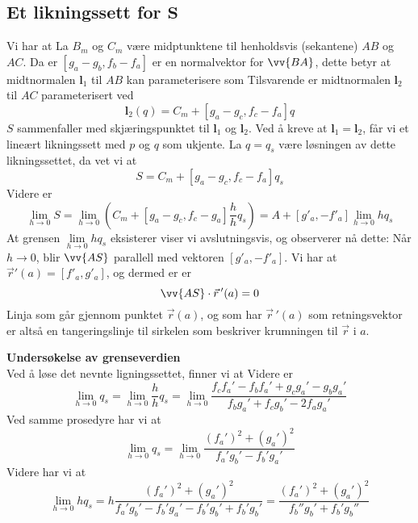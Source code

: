 \subsection*{Et likningssett for $\bm S $}
Vi har at
La $ B_m $ og $ C_m $ være midptunktene til henholdsvis  (sekantene) $ AB $ og $ AC $. Da er
$ [g_a-g_b,f_b-f_a] $ er en normalvektor for $ \vv{BA} $, dette betyr at midtnormalen $\bm l_1 $ til $ AB $ kan parameterisere som
Tilsvarende er midtnormalen $\bm l_2 $ til $ AC $ parameterisert ved
\[ {\bm l_2(q)}=C_m+[g_a-g_c,f_c-f_a] q \]
$ S $ sammenfaller med skjæringspunktet til $\bm l_1 $ og $\bm l_2 $.
Ved å kreve at $\bm l_1= \bm l_2 $, får vi et lineært likningssett med $ p $ og $ q $ som ukjente. La $ q=q_s $ være løsningen av dette likningssettet, da vet vi at
\[ S=C_m+[g_a-g_c, f_c-f_a]q_s\]
Videre er
\[ \lim\limits_{h\to0}S=\lim\limits_{h\to0}\left(C_m+[g_a-g_c, f_c-g_a]\frac{h}{h}q_s\right)=A+[g'_a, -f'_a]\lim\limits_{h\to 0}h q_s \]
At grensen $ \lim\limits_{h\to 0}h q_s $ eksisterer viser vi avslutningsvis, og observerer nå dette: Når $ h\to0 $, blir $ \vv{AS} $ parallell med vektoren $ [g'_a, -f'_a] $. Vi har at $ \vec{r}'(a)=[f'_a, g'_a] $, og dermed er er 
\[ \vv{AS}\cdot \vec{r}\,'(a)=0 \]
Linja som går gjennom punktet $ \vec{r}(a) $, og som har $ \vec{r}\,'(a) $ som retningsvektor er altså en tangeringslinje til sirkelen som beskriver krumningen til $ \vec{r} $ i $ a $. \vsk

\textbf{Undersøkelse av grenseverdien} \\
Ved å løse det nevnte ligningssettet, finner vi at
Videre er
\[ \lim\limits_{h\to 0} q_s=\lim\limits_{h\to 0}\frac{h}{h}q_s=\lim\limits_{h\to 0}\frac{f_cf_a'-f_bf_a'+g_cg_a'-g_bg_a'}{f_bg_a'+f_cg_b'-2f_ag_a'} \]
Ved samme prosedyre har vi at
\[\lim\limits_{h\to 0}q_s= \lim\limits_{h\to 0} \frac{(f_a')^2+(g_a')^2}{f_a'g_b'-f_b'g_a'} \]
Videre har vi at
\[ \lim\limits_{h\to 0}h q_s= h\frac{(f_a')^2+(g_a')^2}{f_a'g_b'-f_b'g_a'-f_b'g_b'+f_b'g_b'}= \frac{(f_a')^2+(g_a')^2}{f_b''g_b'+f_b'g_b''} \]
